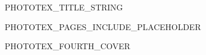 \documentclass[11pt, a4paper, twoside, openright]{book}
\begin{document}
\pagestyle{empty}

\begin{titlepage}
  \hspace{0pt}
  \vfill%
  \begin{center}
    {\fontsize{PHOTOTEX_TITLE_FONT_SIZE}{PHOTOTEX_TITLE_LEADING_SIZE}\selectfont
      PHOTOTEX_TITLE_STRING}
  \end{center}
  \vfill%
  \hspace{0pt}
\end{titlepage}
\newpage\null\thispagestyle{empty}\newpage%

PHOTOTEX_PAGES_INCLUDE_PLACEHOLDER

\newcommand*\cleartoleftpage{%
  \clearpage
  \ifodd\value{page}\hbox{}\newpage\fi
}

\cleartoleftpage%
\begin{center}
  {\Huge PHOTOTEX_FOURTH_COVER}
\end{center}

\end{document}
